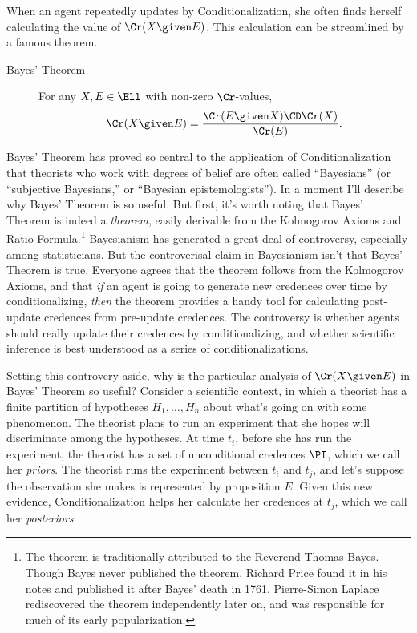 When an agent repeatedly updates by Conditionalization, she often finds herself calculating the value of $\Cr(X \given E)$. This calculation can be streamlined by a famous theorem.
\begin{description}
\item[Bayes' Theorem]{For any $X, E \in \Ell$ with non-zero $\Cr$-values, $$\Cr(X \given E)=\frac{\Cr(E \given X) \CD \Cr(X)}{\Cr(E)}.$$}
\end{description}
Bayes' Theorem has proved so central to the application of Conditionalization that theorists who work with degrees of belief are often called ``Bayesians'' (or ``subjective Bayesians,'' or ``Bayesian epistemologists''). In a moment I'll describe why Bayes' Theorem is so useful. But first, it's worth noting that Bayes' Theorem is indeed a \emph{theorem}, easily derivable from the Kolmogorov Axioms and Ratio Formula.\footnote
{The theorem is traditionally attributed to the Reverend Thomas Bayes. Though Bayes never published the theorem, Richard Price found it in his notes and published it after Bayes' death in 1761. Pierre-Simon Laplace rediscovered the theorem independently later on, and was responsible for much of its early popularization.} 
 Bayesianism has generated a great deal of controversy, especially among statisticians. But the controverisal claim in Bayesianism isn't that Bayes' Theorem is true. Everyone agrees that the theorem follows from the Kolmogorov Axioms, and that \emph{if} an agent is going to generate new credences over time by conditionalizing, \emph{then} the theorem provides a handy tool for calculating post-update credences from pre-update credences. The controversy is whether agents should really update their credences by conditionalizing, and whether scientific inference is best understood as a series of conditionalizations.

Setting this controvery aside, why is the particular analysis of $\Cr(X \given E)$ in Bayes' Theorem so useful? Consider a scientific context, in which a theorist has a finite partition of hypotheses $H_1, \ldots, H_n$ about what's going on with some phenomenon. The theorist plans to run an experiment that she hopes will discriminate among the hypotheses. At time $t_i$, before she has run the experiment, the theorist has a set of unconditional credences $\PI$, which we call her \textit{priors}. The theorist runs the experiment between $t_i$ and $t_j$, and let's suppose the observation she makes is represented by proposition $E$. Given this new evidence, Conditionalization helps her calculate her credences at $t_j$, which we call her \textit{posteriors}.

